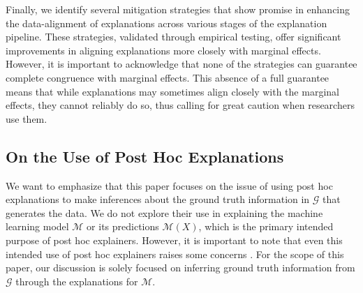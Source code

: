 \documentclass[12pt]{article}  %
\newcommand{\mG}{\mathcal{G}}
\newcommand{\mM}{\mathcal{M}}
\begin{document}
    
  Finally, we identify several mitigation strategies that show promise in enhancing the data-alignment of explanations across various stages of the explanation pipeline. These strategies, validated through empirical testing, offer significant improvements in aligning explanations more closely with marginal effects. However, it is important to acknowledge that none of the strategies can guarantee complete congruence with marginal effects. This absence of a full guarantee means that while explanations may sometimes align closely with the marginal effects, they cannot reliably do so, thus calling for great caution when researchers use them. %
  
\vspace{-3mm}  \subsection{On the Use of Post Hoc Explanations}\vspace{-3mm}
  We want to emphasize that this paper focuses on the issue of using post hoc explanations to make inferences about the ground truth information in $\mG$ that generates the data. We do not explore their use in explaining the machine learning model $\mM$ or its predictions $\mathcal{M}(X)$, which is the primary intended purpose of post hoc explainers. However, it is important to note that even this intended use of post hoc explainers raises some concerns \citep{garreau2020looking,alvarez18robustness,kumar20shap,jacovi2023diagnosing}. For the scope of this paper, our discussion is solely focused on inferring ground truth information from $\mathcal{G}$ through the explanations for $\mathcal{M}$.
\vspace{-3mm}
\end{document}
